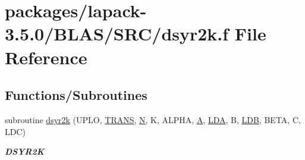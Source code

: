 \hypertarget{lapack-3_85_80_2BLAS_2SRC_2dsyr2k_8f}{}\section{packages/lapack-\/3.5.0/\+B\+L\+A\+S/\+S\+R\+C/dsyr2k.f File Reference}
\label{lapack-3_85_80_2BLAS_2SRC_2dsyr2k_8f}
\subsection*{Functions/\+Subroutines}
\begin{DoxyCompactItemize}
\item 
subroutine \hyperlink{group__double__blas__level3_ga51f6c38a43599163e670f0f6f5645587}{dsyr2k} (U\+P\+L\+O, \hyperlink{superlu__enum__consts_8h_a0c4e17b2d5cea33f9991ccc6a6678d62a1f61e3015bfe0f0c2c3fda4c5a0cdf58}{T\+R\+A\+N\+S}, \hyperlink{polmisc_8c_a0240ac851181b84ac374872dc5434ee4}{N}, K, A\+L\+P\+H\+A, \hyperlink{classA}{A}, \hyperlink{example__user_8c_ae946da542ce0db94dced19b2ecefd1aa}{L\+D\+A}, B, \hyperlink{example__user_8c_a50e90a7104df172b5a89a06c47fcca04}{L\+D\+B}, B\+E\+T\+A, C, L\+D\+C)
\begin{DoxyCompactList}\small\item\em {\bfseries D\+S\+Y\+R2\+K} \end{DoxyCompactList}\end{DoxyCompactItemize}

